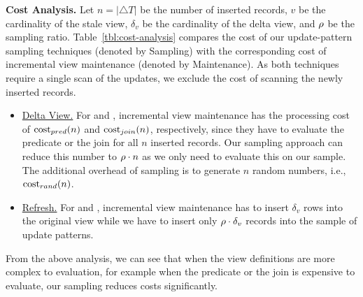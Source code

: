 {\noindent \bf Cost Analysis.} Let $n = |\triangle T|$ be the number of inserted records, $v$ be the cardinality of the stale view, $\delta_v$ be the cardinality of the delta view, and $\rho $ be the sampling ratio. Table~\ref{tbl:cost-analysis} compares the cost of our update-pattern sampling techniques (denoted by Sampling) with the corresponding cost of incremental view maintenance (denoted by Maintenance). As both techniques require a single scan of the updates, we exclude the cost of scanning the newly inserted records.





\vspace{-.5em}

\begin{itemize} %
\item \underline{Delta View.} For \spview and \fjview, incremental view maintenance has the processing cost of $\textrm{cost}_{pred}(n)$ and $\textrm{cost}_{join}(n)$, respectively, since they have to evaluate the predicate or the join for all $n$ inserted records. Our sampling approach can reduce this number to $\rho  \cdot n$ as we only need to evaluate this on our sample. The additional overhead of sampling is to generate $n$ random numbers, i.e., $\textrm{cost}_{rand}(n)$. \vspace{-0.5em}
\item \underline{Refresh.} For \spview and \fjview, incremental view maintenance has to insert $\delta_v$ rows into the original view while we have to insert only $\rho  \cdot \delta_v$ records into the sample of update patterns. %
\end{itemize}
\vspace{-.5em}

From the above analysis, we can see that when the view definitions are more complex to evaluation, for example when the predicate or the join is expensive to evaluate, our sampling reduces costs significantly. 

